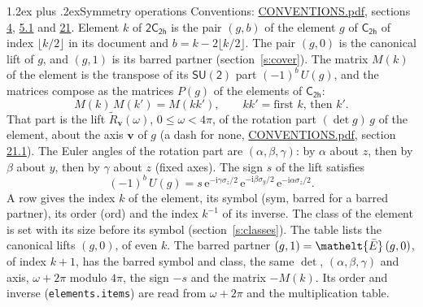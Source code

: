 \documentclass[10pt,a4paper]{article}
\makeatletter
\renewcommand\section{\@startsection{section}{1}{\z@}{-3ex plus -1ex minus -.2ex}%
  {1.2ex plus .2ex}{\normalfont\large\sffamily\bfseries\color{parttitle}}}
\numberwithin{equation}{section}
\newcommand{\eltfont}[1]{{\let\sigma\eltsigma\mathelt{#1}}}
\newcommand{\grp}[1]{\mathsf{#1}}
\newcommand{\elt}[1]{\eltfont{#1}}
\newcommand{\vv}{\mathbf{v}}
\newcommand{\iunit}{\mathrm{i}}
\newcommand{\expe}{\mathrm{e}}
\newcommand{\barred}[1]{\bar{#1}}
\newcommand{\lift}[1]{\tilde{#1}}
\newcommand{\pauli}[1]{\sigma_{#1}}
\makeatother
\begin{document}
\section{Symmetry operations}\label{s:elements}
Conventions: \href{../../CONVENTIONS.pdf}{CONVENTIONS.pdf}, sections \href{../../../rotation/CONVENTIONS.pdf\#conv.4}{4}, \href{../../../rotation/CONVENTIONS.pdf\#conv.5.1}{5.1} and \href{../../CONVENTIONS.pdf\#conv.21}{21}.
\leavevmode\label{n:index.element}\label{n:element.g}Element $k$ of $\grp{2C_{2h}}$ is the pair $(g, b)$ of the element $g$ of \href{../../../rotation/data/pdf/C2h.pdf}{$\grp{C_{2h}}$} of index $\lfloor k/2\rfloor$ in its document and $b = k - 2\lfloor k/2\rfloor$. The pair $(g, 0)$ is the canonical lift of $g$, and $(g, 1)$ is its barred partner (section~\ref{s:cover}). \label{n:matrix.element.pin}\label{n:matrix.element}The matrix $M(k)$ of the element is the transpose of its $\grp{SU(2)}$ part $(-1)^{b}\,U(g)$, and the matrices compose as the matrices $P(g)$ of the elements of $\grp{C_{2h}}$:
\begin{equation}\label{e:mprod}M(k)\,M(k') = M(kk'),\qquad kk' = \text{first } k\text{, then } k'.\end{equation}
\leavevmode\label{n:angle.omega}\label{n:vector.axis}\label{n:vector.pole}That part is the lift $\lift{R}_{\vv}(\omega)$, $0 \le \omega < 4\pi$, of the rotation part $(\det g)\,g$ of the element, about the axis $\vv$ of $g$ (a dash for none, \href{../../CONVENTIONS.pdf}{CONVENTIONS.pdf}, section \href{../../CONVENTIONS.pdf\#conv.21.1}{21.1}). \label{n:angle.euler.alpha}\label{n:angle.euler.beta}\label{n:angle.euler.gamma}\label{n:vector.coordinates}The Euler angles of the rotation part are $(\alpha,\beta,\gamma)$: by $\alpha$ about $z$, then by $\beta$ about $y$, then by $\gamma$ about $z$ (fixed axes). \label{n:local.euler.sign}The sign $s$ of the lift satisfies
\begin{equation}\label{e:euler}(-1)^{b}\,U(g) = s\,\expe^{-\iunit\gamma\pauli{z}/2}\,\expe^{-\iunit\beta\pauli{y}/2}\,\expe^{-\iunit\alpha\pauli{z}/2}.\end{equation}
\leavevmode\label{n:index.element.inverse}\label{n:head.sym}\label{n:head.ord}A row gives the index $k$ of the element, its symbol (sym, barred for a barred partner), its order (ord) and the index $k^{-1}$ of its inverse. \label{n:head.class}The class of the element is set with its size before its symbol (section~\ref{s:classes}).
The table lists the canonical lifts $(g, 0)$, of even $k$. The barred partner $(g, 1) = \elt{\barred{E}}\,(g, 0)$, of index $k + 1$, has the barred symbol and class, the same $\det$, $(\alpha,\beta,\gamma)$ and axis, $\omega + 2\pi$ modulo $4\pi$, the sign $-s$ and the matrix $-M(k)$. Its order and inverse (\texttt{elements.items}) are read from $\omega + 2\pi$ and the multiplication table.
\end{document}
